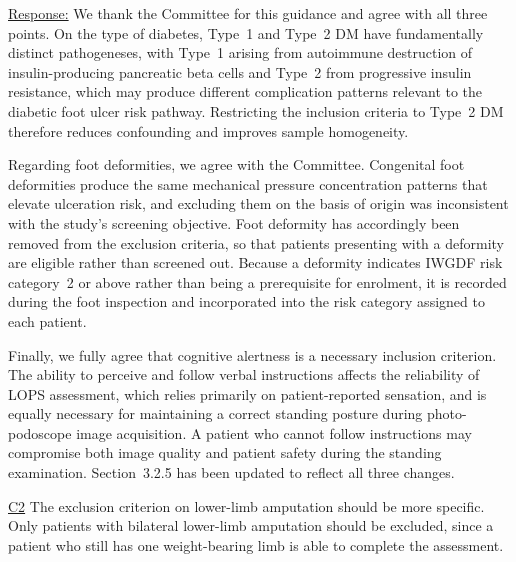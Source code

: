 \documentclass[12pt,a4paper]{article}
\newcommand{\cid}[1]{{\color{cidred}\underline{#1}}}
\newcommand{\mref}[1]{%
  \marginnote{%
    \color{respblue}\scriptsize
    \rule[-0.3ex]{0.6pt}{1.4ex}\hspace{4pt}%
    \parbox[t]{2.4cm}{\raggedright #1}%
  }%
}
\newenvironment{response}{%
  \par\color{respblue}%
}{\par}
\begin{document}
\mref{\S~3.2.5\\[2pt]Inclusion and\\Exclusion\\Criteria}
\begin{response}
\underline{Response:} We thank the Committee for this guidance and agree with all three points. On the type of diabetes, Type~1 and Type~2 DM have fundamentally distinct pathogeneses, with Type~1 arising from autoimmune destruction of insulin-producing pancreatic beta cells and Type~2 from progressive insulin resistance, which may produce different complication patterns relevant to the diabetic foot ulcer risk pathway. Restricting the inclusion criteria to Type~2 DM therefore reduces confounding and improves sample homogeneity.

Regarding foot deformities, we agree with the Committee. Congenital foot deformities produce the same mechanical pressure concentration patterns that elevate ulceration risk, and excluding them on the basis of origin was inconsistent with the study's screening objective. Foot deformity has accordingly been removed from the exclusion criteria, so that patients presenting with a deformity are eligible rather than screened out. Because a deformity indicates IWGDF risk category~2 or above rather than being a prerequisite for enrolment, it is recorded during the foot inspection and incorporated into the risk category assigned to each patient.

Finally, we fully agree that cognitive alertness is a necessary inclusion criterion. The ability to perceive and follow verbal instructions affects the reliability of LOPS assessment, which relies primarily on patient-reported sensation, and is equally necessary for maintaining a correct standing posture during photo-podoscope image acquisition. A patient who cannot follow instructions may compromise both image quality and patient safety during the standing examination. Section~3.2.5 has been updated to reflect all three changes.
\end{response}

\cid{C2} The exclusion criterion on lower-limb amputation should be more specific. Only patients with bilateral lower-limb amputation should be excluded, since a patient who still has one weight-bearing limb is able to complete the assessment.
\end{document}
